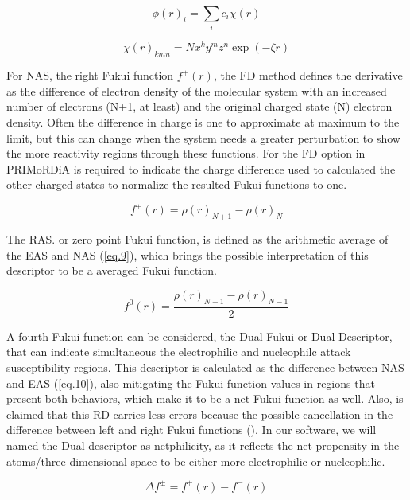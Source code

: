 \documentclass[a4paper,11pt]{refart}
\begin{document}
\begin{equation}
\phi(r)_i = \sum_{i} c_i \chi(r)
\label{eq.5} 
\end{equation}

\begin{equation}
\chi(r)_{kmn} = Nx^k y^m z^n \exp(- \zeta r)
\label{eq.6} 
\end{equation}

For NAS, the right Fukui function $f^{+}(r)$, the FD method defines the derivative as the difference of electron density of the molecular system with an increased number of electrons (N+1, at least) and the original charged state (N) electron density. Often the difference in charge is one to approximate at maximum to the limit, but this can change when the system needs a greater perturbation to show the more reactivity regions through these functions. For the FD option in PRIMoRDiA is required to indicate the charge difference used to calculated the other charged states to normalize the resulted Fukui functions to one.  

\begin{equation}
f^{+}(r) = \rho(r)_{N+1} -\rho(r)_{N}
\label{eq.8}
\end{equation}

The RAS. or zero point Fukui function, is defined as the arithmetic average of the EAS and NAS (\autoref{eq.9}), which brings the possible interpretation of this descriptor to be a averaged Fukui function. 

\begin{equation}
f^{0}(r) = \frac{\rho(r)_{N+1} -\rho (r)_{N-1}}{2}
\label{eq.9}
\end{equation}

A fourth Fukui function can be considered, the Dual Fukui or Dual Descriptor, that can indicate simultaneous the electrophilic and nucleophilc attack susceptibility regions. This descriptor is calculated as the difference between NAS and EAS (\autoref{eq.10}), also mitigating the Fukui function values in regions that present both behaviors, which make it to be a net Fukui function as well. Also, is claimed that this RD carries less errors because the possible cancellation in the difference between left and right Fukui functions  (\cite{martinez2015dual}). In our software, we will named the Dual descriptor as netphilicity, as it reflects the net propensity in the atoms/three-dimensional space to be either more electrophilic or nucleophilic.

\begin{equation}
\Delta f^{\pm} = f^{+}(r) - f^{-}(r)
\label{eq.10}
\end{equation}
\end{document}
